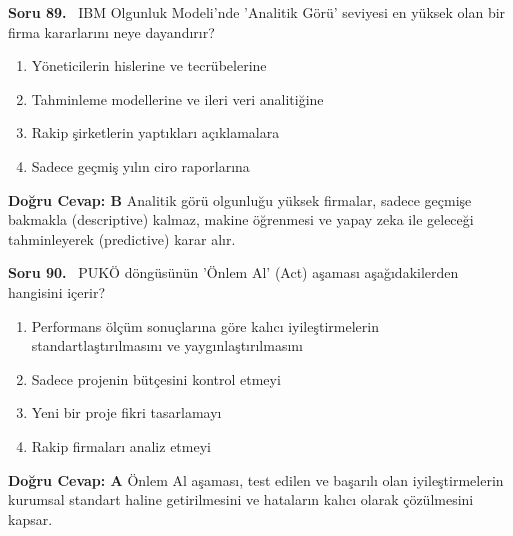 \documentclass[11pt,a4paper,openany]{book}
\begin{document}
\needspace{5cm}
\vspace{8pt}
\noindent\textbf{\large\sffamily Soru 89.} \ IBM Olgunluk Modeli'nde 'Analitik Görü' seviyesi en yüksek olan bir firma kararlarını neye dayandırır?
\begin{enumerate}[label=\Alph*), leftmargin=25pt, topsep=4pt, itemsep=2pt]
    \item Yöneticilerin hislerine ve tecrübelerine
    \item Tahminleme modellerine ve ileri veri analitiğine
    \item Rakip şirketlerin yaptıkları açıklamalara
    \item Sadece geçmiş yılın ciro raporlarına
\end{enumerate}
\vspace{4pt}
\begin{tcolorbox}[title=Cevap ve Açıklama, colback=gray!3!white, colframe=primarycolor!90!black, arc=2mm, fonttitle=\bfseries\sffamily, top=6pt, bottom=6pt]
    \textbf{Doğru Cevap: B}
    \vspace{2pt}
    Analitik görü olgunluğu yüksek firmalar, sadece geçmişe bakmakla (descriptive) kalmaz, makine öğrenmesi ve yapay zeka ile geleceği tahminleyerek (predictive) karar alır.
\end{tcolorbox}
\vspace{10pt}

\needspace{5cm}
\vspace{8pt}
\noindent\textbf{\large\sffamily Soru 90.} \ PUKÖ döngüsünün 'Önlem Al' (Act) aşaması aşağıdakilerden hangisini içerir?
\begin{enumerate}[label=\Alph*), leftmargin=25pt, topsep=4pt, itemsep=2pt]
    \item Performans ölçüm sonuçlarına göre kalıcı iyileştirmelerin standartlaştırılmasını ve yaygınlaştırılmasını
    \item Sadece projenin bütçesini kontrol etmeyi
    \item Yeni bir proje fikri tasarlamayı
    \item Rakip firmaları analiz etmeyi
\end{enumerate}
\vspace{4pt}
\begin{tcolorbox}[title=Cevap ve Açıklama, colback=gray!3!white, colframe=primarycolor!90!black, arc=2mm, fonttitle=\bfseries\sffamily, top=6pt, bottom=6pt]
    \textbf{Doğru Cevap: A}
    \vspace{2pt}
    Önlem Al aşaması, test edilen ve başarılı olan iyileştirmelerin kurumsal standart haline getirilmesini ve hataların kalıcı olarak çözülmesini kapsar.
\end{tcolorbox}
\vspace{10pt}
\end{document}
